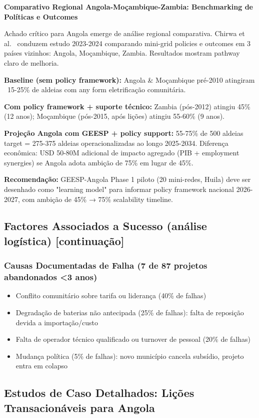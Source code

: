 \documentclass[12pt, a4paper]{article}
\begin{document}
\textbf{Comparativo Regional Angola-Moçambique-Zambia: Benchmarking de Políticas e Outcomes}

Achado crítico para Angola emerge de análise regional comparativa. Chirwa et al.~\citep{Chirwa2024} conduzem estudo 2023-2024 comparando mini-grid policies e outcomes em 3 países vizinhos: Angola, Moçambique, Zambia. Resultados mostram pathway claro de melhoria.

\textbf{Baseline (sem policy framework):} Angola \& Moçambique pré-2010 atingiram ~15-25\% de aldeias com any form eletrificação comunitária.

\textbf{Com policy framework + suporte técnico:} Zambia (pós-2012) atingiu 45\% (12 anos); Moçambique (pós-2015, após lições) atingiu 55-60\% (9 anos).

\textbf{Projeção Angola com GEESP + policy support:} 55-75\% de 500 aldeias target = 275-375 aldeias operacionalizadas ao longo 2025-2034. Diferença econômica: USD 50-80M adicional de impacto agregado (PIB + employment synergies) se Angola adota ambição de 75\% em lugar de 45\%.

\textbf{Recomendação:} GEESP-Angola Phase 1 piloto (20 mini-redes, Huila) deve ser desenhado como "learning model" para informar policy framework nacional 2026-2027, com ambição de 45\% → 75\% scalability timeline.

\subsection{Factores Associados a Sucesso (análise logística) [continuação]}

\subsubsection{Causas Documentadas de Falha (7 de 87 projetos abandonados <3 anos)}
\begin{itemize}
\item Conflito comunitário sobre tarifa ou liderança (40\% de falhas)
\item Degradação de baterias não antecipada (25\% de falhas): falta de reposição devida a importação/custo
\item Falta de operador técnico qualificado ou turnover de pessoal (20\% de falhas)
\item Mudança política (5\% de falhas): novo município cancela subsídio, projeto entra em colapso
\end{itemize}

\subsection{Estudos de Caso Detalhados: Lições Transacionáveis para Angola}
\end{document}
